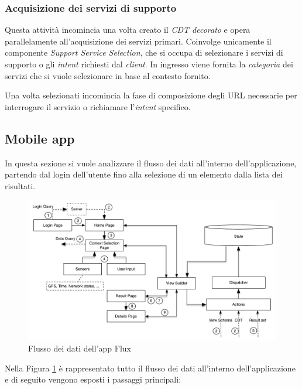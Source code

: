 \subsubsection*{Acquisizione dei servizi di supporto}

Questa attività incomincia una volta creato il \emph{CDT decorato} e opera parallelamente all'acquisizione dei servizi primari. Coinvolge unicamente il componente \emph{Support Service Selection}, che si occupa di selezionare i servizi di supporto o gli \emph{intent} richiesti dal \emph{client}. In ingresso viene fornita la \emph{categoria} dei servizi che si vuole selezionare in base al contesto fornito.

Una volta selezionati incomincia la fase di composizione degli URL necessarie per interrogare il servizio o richiamare l'\emph{intent} specifico.

\subsection{Mobile app}

In questa sezione si vuole analizzare il flusso dei dati all'interno dell'applicazione, partendo dal login dell'utente fino alla selezione di un elemento dalla lista dei risultati.

\begin{figure}[H]
	\centering
	\includegraphics[width=\textwidth]{4-progettazione-alto-livello/Immagini/app_dataflow.pdf}
	\caption{Flusso dei dati dell'app Flux}\label{fig:app-dataflow}
\end{figure}

Nella Figura \ref{fig:app-dataflow} è rappresentato tutto il flusso dei dati all'interno dell'ap\-pli\-ca\-zio\-ne e di seguito vengono esposti i passaggi principali:

